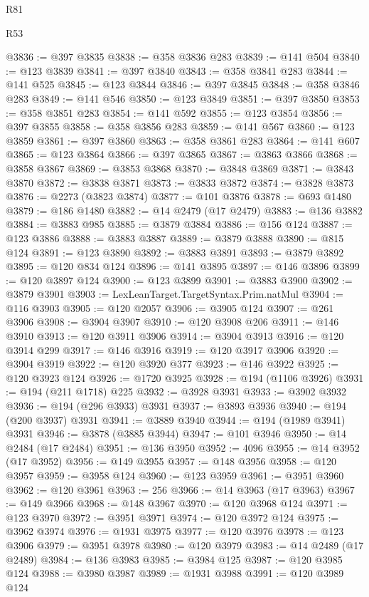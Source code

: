 \begin{lexlean}{R81}
\begin{lexlean}{R53}
\begin{coremodule}
{{{{{{{{{{{{{{{{{{{{{{{{{{{{{{{{{{{{{{{{{{{{{{{{{{{{{{{{{{{{{{{{{{{{{{{{{{{{{{{{{{{{{{{{{{{{{{{{{{{{{{{{{{{{{{{{@3836 := @397 @3835
@3838 := @358 @3836 @283
@3839 := @141 @504
@3840 := @123 @3839
@3841 := @397 @3840
@3843 := @358 @3841 @283
@3844 := @141 @525
@3845 := @123 @3844
@3846 := @397 @3845
@3848 := @358 @3846 @283
@3849 := @141 @546
@3850 := @123 @3849
@3851 := @397 @3850
@3853 := @358 @3851 @283
@3854 := @141 @592
@3855 := @123 @3854
@3856 := @397 @3855
@3858 := @358 @3856 @283
@3859 := @141 @567
@3860 := @123 @3859
@3861 := @397 @3860
@3863 := @358 @3861 @283
@3864 := @141 @607
@3865 := @123 @3864
@3866 := @397 @3865
@3867 := @3863 @3866
@3868 := @3858 @3867
@3869 := @3853 @3868
@3870 := @3848 @3869
@3871 := @3843 @3870
@3872 := @3838 @3871
@3873 := @3833 @3872
@3874 := @3828 @3873
@3876 := @2273 (@3823 @3874)
@3877 := @101 @3876
@3878 := @693 @1480
@3879 := @186 @1480
@3882 := @14 @2479 (@17 @2479)
@3883 := @136 @3882
@3884 := @3883 @985
@3885 := @3879 @3884
@3886 := @156 @124
@3887 := @123 @3886
@3888 := @3883 @3887
@3889 := @3879 @3888
@3890 := @815 @124
@3891 := @123 @3890
@3892 := @3883 @3891
@3893 := @3879 @3892
@3895 := @120 @834 @124
@3896 := @141 @3895
@3897 := @146 @3896
@3899 := @120 @3897 @124
@3900 := @123 @3899
@3901 := @3883 @3900
@3902 := @3879 @3901
@3903 := LexLeanTarget.TargetSyntax.Prim.natMul
@3904 := @116 @3903
@3905 := @120 @2057
@3906 := @3905 @124
@3907 := @261 @3906
@3908 := @3904 @3907
@3910 := @120 @3908 @206
@3911 := @146 @3910
@3913 := @120 @3911 @3906
@3914 := @3904 @3913
@3916 := @120 @3914 @299
@3917 := @146 @3916
@3919 := @120 @3917 @3906
@3920 := @3904 @3919
@3922 := @120 @3920 @377
@3923 := @146 @3922
@3925 := @120 @3923 @124
@3926 := @1720 @3925
@3928 := @194 (@1106 @3926)
@3931 := @194 (@211 @1718) @225
@3932 := @3928 @3931
@3933 := @3902 @3932
@3936 := @194 (@296 @3933) @3931
@3937 := @3893 @3936
@3940 := @194 (@200 @3937) @3931
@3941 := @3889 @3940
@3944 := @194 (@1989 @3941) @3931
@3946 := @3878 (@3885 @3944)
@3947 := @101 @3946
@3950 := @14 @2484 (@17 @2484)
@3951 := @136 @3950
@3952 := 4096
@3955 := @14 @3952 (@17 @3952)
@3956 := @149 @3955
@3957 := @148 @3956
@3958 := @120 @3957
@3959 := @3958 @124
@3960 := @123 @3959
@3961 := @3951 @3960
@3962 := @120 @3961
@3963 := 256
@3966 := @14 @3963 (@17 @3963)
@3967 := @149 @3966
@3968 := @148 @3967
@3970 := @120 @3968 @124
@3971 := @123 @3970
@3972 := @3951 @3971
@3974 := @120 @3972 @124
@3975 := @3962 @3974
@3976 := @1931 @3975
@3977 := @120 @3976
@3978 := @123 @3906
@3979 := @3951 @3978
@3980 := @120 @3979
@3983 := @14 @2489 (@17 @2489)
@3984 := @136 @3983
@3985 := @3984 @125
@3987 := @120 @3985 @124
@3988 := @3980 @3987
@3989 := @1931 @3988
@3991 := @120 @3989 @124
}}}}}}}}}}}}}}}}}}}}}}}}}}}}}}}}}}}}}}}}}}}}}}}}}}}}}}}}}}}}}}}}}}}}}}}}}}}}}}}}}}}}}}}}}}}}}}}}}}}}}}}}}}}}}}}}
\end{coremodule}
\end{lexlean}
\end{lexlean}
